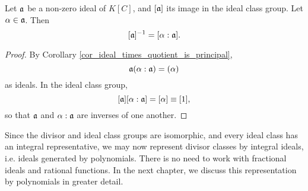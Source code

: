 \begin{proposition}
  \label{prop_integral_ideal_inverse}
  Let $\frak a$ be a non-zero ideal of $K[C]$,
  and $[\frak a]$ its image in the ideal class group.
  Let $\alpha \in \frak a$. Then
  \[ [\frak a]^{-1} = [\alpha : \frak a]. \]
\end{proposition}
\begin{proof}
  By Corollary \ref{cor_ideal_times_quotient_is_principal},
  \[ \frak a(\alpha : \frak a) = (\alpha) \]
  as ideals.
  In the ideal class group,
  \[ [\frak a][\alpha : \frak a] = [\alpha] \equiv [1], \]
  so that $\frak a$ and $\alpha : \frak a$ are inverses of one another.
\end{proof}

Since the divisor and ideal class groups are isomorphic, and every ideal class has an integral representative,
we may now represent divisor classes by integral ideals, i.e. ideals generated by polynomials.
There is no need to work with fractional ideals and rational functions.
In the next chapter, we discuss this representation by polynomials in greater detail.
